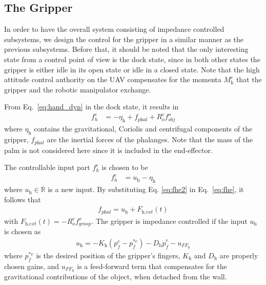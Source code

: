 \documentclass[a4paper, 10pt, conference]{ieeeconf}
\renewcommand{\cdot}{}  %
\begin{document}
\subsection{The Gripper}
In order to have the overall system consisting of impedance controlled subsystems, we design the control for the gripper in a similar manner as the previous subsystems. Before that, it should be noted that the only interesting state from a control point of view is the dock state, since in both other states the gripper is either idle in its open state or idle in a closed state. Note that the high attitude control authority on the UAV compensates for the momenta $M_\textit{h}^e$ that the gripper and the robotic manipulator exchange.

From Eq.~\ref{eq:hand_dyn} in the dock state, it results in
\begin{align}
f_h^e &= - \eta_\textit{h} + f_\textit{phal}+ R_o^e \cdot f_\textit{obj}^o
\label{eq:fhe}
\end{align}
where $\eta_\textit{h}$ contains the gravitational, Coriolis and centrifugal components of the gripper, $f_\textit{phal}$ are the inertial forces of the phalanges. Note that the mass of the palm is not considered here since it is included in the end-effector. %

The controllable input part $f_h^e$ is chosen to be
\begin{align}
f_h^e &= u_\textit{h} - \eta_\textit{h}
\label{eq:fhe2}
\end{align}
where $u_\textit{h} \in \mathbb{R}$ is a new input. By substituting Eq. \ref{eq:fhe2} in
Eq.~\ref{eq:fhe}, it follows that
\begin{align*}
f_\textit{phal} = u_\textit{h} + F_\textit{h,ext}(t)
\end{align*}
with $F_\textit{h,ext}(t) = - R_o^e \cdot f_\textit{grasp}^o $. The gripper is impedance controlled if the input $u_\textit{h}$ is chosen as%
\begin{align*}
u_\textit{h} = -K_\textit{h} (p_f^e-p_f^{* e}) - D_\textit{h} \dot{p}_f^e - u_{FF_{\textit{h}}}
\end{align*}
where $p_f^{* e}$ is the desired position of the gripper's fingers, $K_\textit{h}$ and $D_\textit{h}$ are properly chosen gains, and $u_{FF_{\textit{h}}}$ is a feed-forward term that compensates for the gravitational contributions of the object, when detached from the wall.
\end{document}
